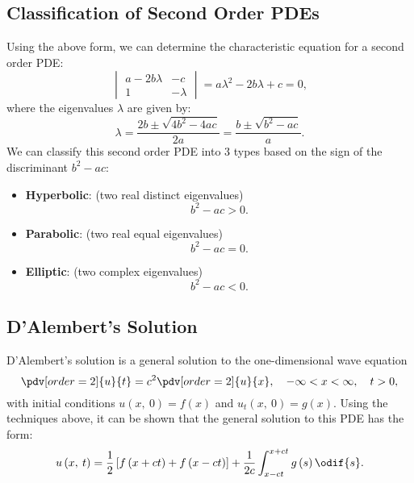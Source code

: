 \documentclass{article}
\theoremstyle{definition}
\begin{document}
\subsection{Classification of Second Order PDEs}
Using the above form, we can determine the characteristic equation for
a second order PDE:
\begin{equation*}
    \begin{vmatrix}
        a - 2b \lambda & -c       \\
        1              & -\lambda
    \end{vmatrix}
    = a \lambda^2 - 2b \lambda + c = 0,
\end{equation*}
where the eigenvalues \(\lambda\) are given by:
\begin{equation*}
    \lambda = \frac{2b \pm \sqrt{4b^2 - 4ac}}{2a} = \frac{b \pm \sqrt{b^2 - ac}}{a}.
\end{equation*}
We can classify this second order PDE into 3 types based on the sign of
the discriminant \(b^2 - ac\):
\begin{itemize}
    \item \textbf{Hyperbolic}: (two real distinct eigenvalues)
          \begin{equation*}
              b^2 - ac > 0.
          \end{equation*}
    \item \textbf{Parabolic}: (two real equal eigenvalues)
          \begin{equation*}
              b^2 - ac = 0.
          \end{equation*}
    \item \textbf{Elliptic}: (two complex eigenvalues)
          \begin{equation*}
              b^2 - ac < 0.
          \end{equation*}
\end{itemize}
\subsection{D'Alembert's Solution}
D'Alembert's solution is a general solution to the one-dimensional wave
equation
\begin{equation*}
    \pdv[order=2]{u}{t} = c^2 \pdv[order=2]{u}{x}, \quad -\infty < x < \infty, \quad t > 0,
\end{equation*}
with initial conditions \(u\left( x,\: 0 \right) = f\left( x \right)\)
and \(u_t\left( x,\: 0 \right) = g\left( x \right)\). Using the
techniques above, it can be shown that the general solution to this PDE
has the form:
\begin{equation*}
    u\left( x,\: t \right) = \frac{1}{2} \left[ f\left( x + c t \right) + f\left( x - c t \right) \right] + \frac{1}{2c} \int_{x - c t}^{x + c t} g\left( s \right) \odif{s}.
\end{equation*}
\end{document}
